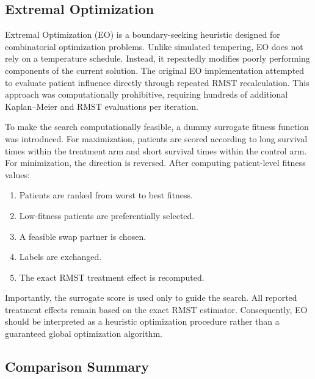\documentclass[11pt]{article}
\begin{document}
\subsection{Extremal Optimization}

Extremal Optimization (EO) is a boundary-seeking heuristic designed for combinatorial optimization problems.
Unlike simulated tempering, EO does not rely on a temperature schedule. Instead, it repeatedly modifies poorly performing components of the current solution.
The original EO implementation attempted to evaluate patient influence directly through repeated RMST recalculation. This approach was computationally prohibitive, requiring hundreds of additional Kaplan--Meier and RMST evaluations per iteration.

To make the search computationally feasible, a dummy surrogate fitness function was introduced.
For maximization, patients are scored according to long survival times within the treatment arm and short survival times within the control arm. For minimization, the direction is reversed.
After computing patient-level fitness values:
\begin{enumerate}
\item Patients are ranked from worst to best fitness.
\item Low-fitness patients are preferentially selected.
\item A feasible swap partner is chosen.
\item Labels are exchanged.
\item The exact RMST treatment effect is recomputed.
\end{enumerate}

Importantly, the surrogate score is used only to guide the search. All reported treatment effects remain based on the exact RMST estimator.
Consequently, EO should be interpreted as a heuristic optimization procedure rather than a guaranteed global optimization algorithm.

\subsection{Comparison Summary}
\end{document}
